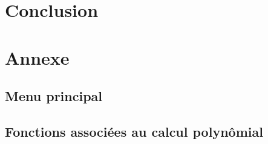 \documentclass{report}
\begin{document}
  \chapter{Conclusion}
  
  \chapter{Annexe}
    \section{Menu principal}
      
    \section{Fonctions associées au calcul polynômial}
      
      
\end{document}
